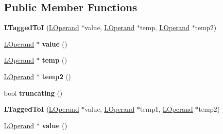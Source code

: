 \subsection*{Public Member Functions}
\begin{DoxyCompactItemize}
\item 
{\bfseries L\+Tagged\+ToI} (\hyperlink{classv8_1_1internal_1_1_l_operand}{L\+Operand} $\ast$value, \hyperlink{classv8_1_1internal_1_1_l_operand}{L\+Operand} $\ast$temp, \hyperlink{classv8_1_1internal_1_1_l_operand}{L\+Operand} $\ast$temp2)\hypertarget{classv8_1_1internal_1_1_l_tagged_to_i_afacde0d4471ca6d7246bf7ea8e226f33}{}\label{classv8_1_1internal_1_1_l_tagged_to_i_afacde0d4471ca6d7246bf7ea8e226f33}

\item 
\hyperlink{classv8_1_1internal_1_1_l_operand}{L\+Operand} $\ast$ {\bfseries value} ()\hypertarget{classv8_1_1internal_1_1_l_tagged_to_i_af847eb991b1b476ad690972a7266618d}{}\label{classv8_1_1internal_1_1_l_tagged_to_i_af847eb991b1b476ad690972a7266618d}

\item 
\hyperlink{classv8_1_1internal_1_1_l_operand}{L\+Operand} $\ast$ {\bfseries temp} ()\hypertarget{classv8_1_1internal_1_1_l_tagged_to_i_adc8b5fff519135913c9d0104c2fc6846}{}\label{classv8_1_1internal_1_1_l_tagged_to_i_adc8b5fff519135913c9d0104c2fc6846}

\item 
\hyperlink{classv8_1_1internal_1_1_l_operand}{L\+Operand} $\ast$ {\bfseries temp2} ()\hypertarget{classv8_1_1internal_1_1_l_tagged_to_i_a379b9f67eadcfd31650957f0d0c686a8}{}\label{classv8_1_1internal_1_1_l_tagged_to_i_a379b9f67eadcfd31650957f0d0c686a8}

\item 
bool {\bfseries truncating} ()\hypertarget{classv8_1_1internal_1_1_l_tagged_to_i_abb946d8222ed5fd6b32d2f5f99cbe24b}{}\label{classv8_1_1internal_1_1_l_tagged_to_i_abb946d8222ed5fd6b32d2f5f99cbe24b}

\item 
{\bfseries L\+Tagged\+ToI} (\hyperlink{classv8_1_1internal_1_1_l_operand}{L\+Operand} $\ast$value, \hyperlink{classv8_1_1internal_1_1_l_operand}{L\+Operand} $\ast$temp1, \hyperlink{classv8_1_1internal_1_1_l_operand}{L\+Operand} $\ast$temp2)\hypertarget{classv8_1_1internal_1_1_l_tagged_to_i_a2c5bb2f28efcaec2c4c6b5abb880f593}{}\label{classv8_1_1internal_1_1_l_tagged_to_i_a2c5bb2f28efcaec2c4c6b5abb880f593}

\item 
\hyperlink{classv8_1_1internal_1_1_l_operand}{L\+Operand} $\ast$ {\bfseries value} ()\hypertarget{classv8_1_1internal_1_1_l_tagged_to_i_af847eb991b1b476ad690972a7266618d}{}\label{classv8_1_1internal_1_1_l_tagged_to_i_af847eb991b1b476ad690972a7266618d}


\end{DoxyCompactItemize}
